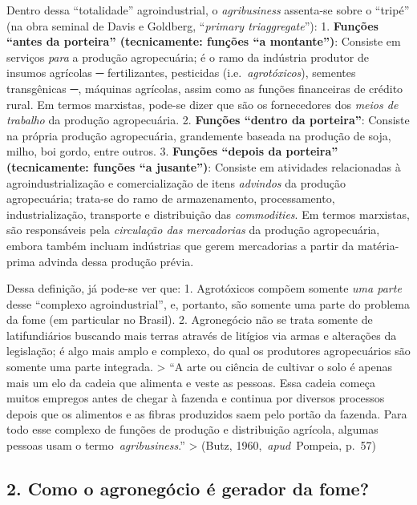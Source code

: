 \documentclass[12pt]{article}
\numberwithin{equation}{section}
\theoremstyle{plain}
\theoremstyle{definition}
\theoremstyle{remark}
\begin{document}
Dentro dessa ``totalidade'' agroindustrial, o \textit{agribusiness} assenta-se sobre o ``tripé'' (na obra seminal de Davis e Goldberg, ``\textit{primary triaggregate}''): 1. \textbf{Funções ``antes da porteira'' (tecnicamente: funções ``a montante'')}: Consiste em serviços \textit{para} a produção agropecuária; é o ramo da indústria produtor de insumos agrícolas ─ fertilizantes, pesticidas (i.e.~\textit{agrotóxicos}), sementes transgênicas ─, máquinas agrícolas, assim como as funções financeiras de crédito rural. Em termos marxistas, pode-se dizer que são os fornecedores dos \textit{meios de trabalho} da produção agropecuária. 2. \textbf{Funções ``dentro da porteira''}: Consiste na própria produção agropecuária, grandemente baseada na produção de soja, milho, boi gordo, entre outros. 3. \textbf{Funções ``depois da porteira'' (tecnicamente: funções ``a jusante'')}: Consiste em atividades relacionadas à agroindustrialização e comercialização de itens \textit{advindos} da produção agropecuária; trata-se do ramo de armazenamento, processamento, industrialização, transporte e distribuição das \textit{commodities}. Em termos marxistas, são responsáveis pela \textit{circulação das mercadorias} da produção agropecuária, embora também incluam indústrias que gerem mercadorias a partir da matéria-prima advinda dessa produção prévia.

Dessa definição, já pode-se ver que: 1. Agrotóxicos compõem somente \textit{uma parte} desse ``complexo agroindustrial'', e, portanto, são somente uma parte do problema da fome (em particular no Brasil). 2. Agronegócio não se trata somente de latifundiários buscando mais terras através de litígios via armas e alterações da legislação; é algo mais amplo e complexo, do qual os produtores agropecuários são somente uma parte integrada. \textgreater{} ``A arte ou ciência de cultivar o solo é apenas mais um elo da cadeia que alimenta e veste as pessoas. Essa cadeia começa muitos empregos antes de chegar à fazenda e continua por diversos processos depois que os alimentos e as fibras produzidos saem pelo portão da fazenda. Para todo esse complexo de funções de produção e distribuição agrícola, algumas pessoas usam o termo~\textit{agribusiness}.'' \textgreater{} (Butz, 1960,~\textit{apud}~Pompeia, p.~57)

\hypertarget{como-o-agroneguxf3cio-uxe9-gerador-da-fome}{%
\subsection{2. Como o agronegócio é gerador da fome?}\label{como-o-agroneguxf3cio-uxe9-gerador-da-fome}}
\end{document}
